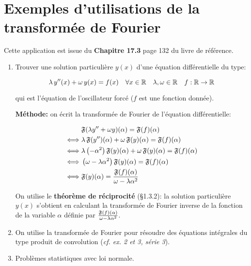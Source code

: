 \newpage

\section{Exemples d'utilisations de la transformée de Fourier}

\begin{note}
    Cette application est issue du \textbf{Chapitre 17.3} page 132 du livre de référence.
\end{note}

\begin{enumerate}[label=\alph*)]
    \item
    Trouver une solution particulière $y(x)$ d'une équation différentielle du type:
    
    \[\lambda\, y''(x) + \omega\, y(x) = f(x) \quad \forall x \in \mathbb{R} \quad \lambda, \omega \in \mathbb{R} \quad f: \mathbb{R} \rightarrow \mathbb{R}\]
    
    qui est l'équation de l'oscillateur forcé ($f$ est une fonction donnée).
    
    \textbf{Méthode:} on écrit la transformée de Fourier de l'équation différentielle:
    
    \begin{align*}
    &\mathfrak{F}(\lambda y'' + \omega y)(\alpha) = \mathfrak{F}(f)(\alpha)
    \\\iff&
    \lambda \, \mathfrak{F}(y'')(\alpha) + \omega \, \mathfrak{F}(y)(\alpha) = \mathfrak{F}(f)(\alpha)
    \\\iff&
    \lambda \left(-\alpha^2\right) \mathfrak{F}(y)(\alpha) + \omega \, \mathfrak{F}(y)(\alpha) = \mathfrak{F}(f)(\alpha)
    \\\iff&
    \left(\omega - \lambda \alpha^2\right) \mathfrak{F}(y)(\alpha) = \mathfrak{F}(f)(\alpha)
    \\\iff&
    \mathfrak{F}(y)(\alpha) = \frac{\mathfrak{F}(f)(\alpha)}{\omega - \lambda \alpha^2}
    \end{align*}
    
    On utilise le \textbf{théorème de réciprocité} (§1.3.2): la solution particulière $y(x)$ s'obtient en calculant la transformée de Fourier inverse de la fonction de la variable $\alpha$ définie par $\frac{\mathfrak{F}(f)(\alpha)}{\omega - \lambda \alpha^2}$.
    
    
    \item
    On utilise la transformée de Fourier pour résoudre des équations intégrales du type produit de convolution (\textit{cf. ex. 2 et 3, série 3}).
    
    
    \item
    Problèmes statistiques avec loi normale.
    

\end{enumerate}
